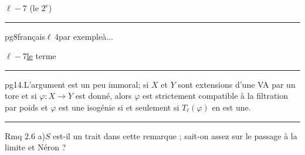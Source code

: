 \quad $\ell-7$\quad
{}
(le $2^{\mathrm{e}}$)

\rule{\linewidth}{0.3pt}

pg8\quad français\quad $\ell\,4$\quad par exemple\quad à\quad $\ldots$

$\ell-7$\quad \uline{le} terme

\rule{\linewidth}{0.3pt}

pg14.\quad L'argument est un peu immoral; si $X$ et $Y$ sont extensions d'une VA par un tore et si $\varphi:X\longrightarrow Y$ est donné, alors $\varphi$ est strictement compatible à la filtration par  poids et $\varphi$ est une isogénie si et seulement si $T_\ell(\varphi)$ en est une.

\rule{\linewidth}{0.3pt}

Rmq 2.6 a)\quad $S$ est-il un trait dans cette remarque ; sait-on assez sur le passage à la limite et Néron ?

